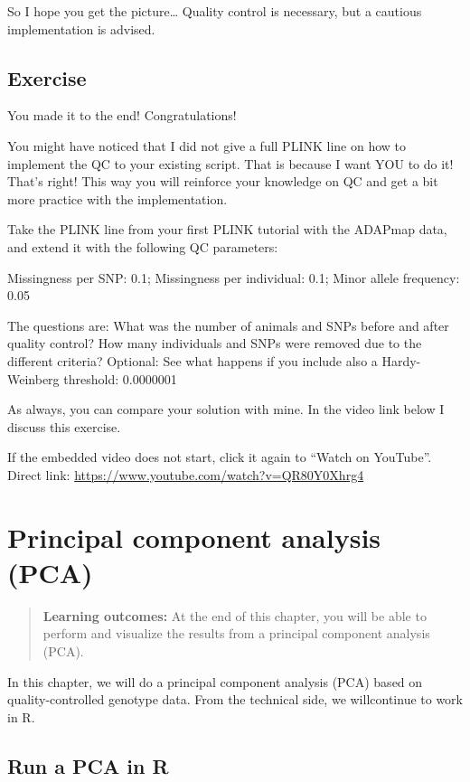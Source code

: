 \documentclass[]{book}
\begin{document}
So I hope you get the picture\ldots{} Quality control is necessary, but
a cautious implementation is advised.

\section{Exercise}\label{exercise-2}

You made it to the end! Congratulations!

You might have noticed that I did not give a full PLINK line on how to
implement the QC to your existing script. That is because I want YOU to
do it! That's right! This way you will reinforce your knowledge on QC
and get a bit more practice with the implementation.

Take the PLINK line from your first PLINK tutorial with the ADAPmap
data, and extend it with the following QC parameters:

Missingness per SNP: 0.1; Missingness per individual: 0.1; Minor allele
frequency: 0.05

The questions are: What was the number of animals and SNPs before and
after quality control? How many individuals and SNPs were removed due to
the different criteria? Optional: See what happens if you include also a
Hardy-Weinberg threshold: 0.0000001

As always, you can compare your solution with mine. In the video link
below I discuss this exercise.

If the embedded video does not start, click it again to ``Watch on
YouTube''. Direct link:
\url{https://www.youtube.com/watch?v=QR80Y0Xhrg4}

\chapter{Principal component analysis
(PCA)}\label{principal-component-analysis-pca}

\begin{quote}
\textbf{Learning outcomes:} At the end of this chapter, you will be able
to perform and visualize the results from a principal component analysis
(PCA).
\end{quote}

In this chapter, we will do a principal component analysis (PCA) based
on quality-controlled genotype data. From the technical side, we
willcontinue to work in R.

\section{Run a PCA in R}\label{run-a-pca-in-r}
\end{document}
